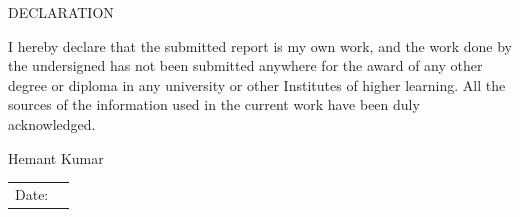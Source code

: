 \documentclass[12pt,letterpaper]{article}
\begin{document}
\newpage
    \begin{center}
        \vspace*{1cm}
            \LARGE DECLARATION

            \vspace{1.2cm}

            \large I hereby declare that the submitted report is my own work, and the work done by the undersigned has not been submitted anywhere for the award of any other degree or diploma in any university or other Institutes of higher learning. All the sources of the information used in the current work have been duly acknowledged.

            \vfill

                
            \hfill {Hemant Kumar \\
            \hfill \begin{tabular}{@{}l l@{}} Date: & \underline{\hspace{4cm}} \end{tabular}}

            
            
            \vspace*{2 cm}
    \end{center}
\end{document}
